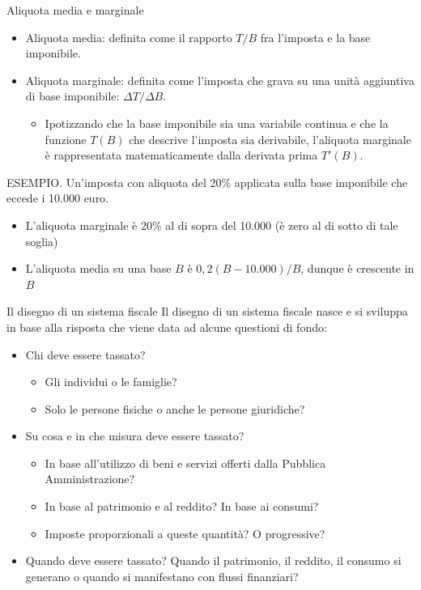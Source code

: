 \documentclass[11pt]{beamer}
\begin{document}
\begin{frame}{Aliquota media e marginale}
\begin{itemize}
\item \alert{Aliquota media:} definita come il rapporto $T/B$ fra l'imposta e la base imponibile.
\item \alert{Aliquota marginale:} definita come l'imposta che grava su una unità aggiuntiva di base imponibile: $\Delta T/\Delta B$.
\begin{itemize}
\item Ipotizzando che la base imponibile sia una variabile continua e che la
funzione $T(B)$ che descrive l'imposta sia derivabile, l'aliquota
marginale è rappresentata matematicamente dalla derivata prima $T'(B)$.
\end{itemize}
\end{itemize}

\begin{block}{}
\footnotesize
\alert{ESEMPIO}. Un'imposta con aliquota del 20\% applicata sulla base imponibile che eccede i 10.000 euro.
\begin{itemize}
\item L'aliquota marginale è 20\% al di sopra del 10.000 (è zero al di sotto di tale soglia)
\item L'aliquota media su una base $B$ è $0,2(B-10.000)/B$, dunque è crescente in $B$
\end{itemize}
\end{block}
\end{frame}


\begin{frame}{Il disegno di un sistema fiscale}
Il disegno di un sistema fiscale nasce e si sviluppa in base alla
risposta che viene data ad alcune questioni di fondo:
\begin{itemize}
\item \alert{Chi} deve essere tassato?
\begin{itemize}
\item Gli individui o le famiglie?
\item Solo le persone fisiche o anche le persone giuridiche?
\end{itemize}
\item \alert{Su cosa} e \alert{in che misura} deve essere tassato?\\[0pt]
\begin{itemize}
\item In base all'utilizzo di beni e servizi offerti dalla Pubblica Amministrazione?
\item In base al patrimonio e al reddito? In base ai consumi?
\item Imposte proporzionali a queste quantità? O progressive?
\end{itemize}
\item \alert{Quando} deve essere tassato?  Quando il patrimonio, il reddito, il consumo
si generano o quando si manifestano con flussi finanziari?
\end{itemize}
\end{frame}
\end{document}
